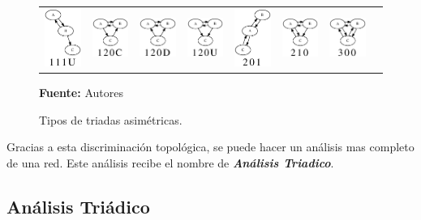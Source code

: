 \begin{figure}[!htb]
\begin{center}
\begin{tabular}{m{1.3cm}|m{1.3cm}|m{1.3cm}|m{1.3cm}|m{1.3cm}|m{1.3cm}|m{1.3cm}|m{1.3cm}}
        \includegraphics[width=1.3cm]{./imagenes/triada_111U.eps} & 
        \includegraphics[width=1.3cm]{./imagenes/triada_120C.eps} & 
        \includegraphics[width=1.3cm]{./imagenes/triada_120D.eps} & 
        \includegraphics[width=1.3cm]{./imagenes/triada_120U.eps} & 
        \includegraphics[width=1.3cm]{./imagenes/triada_201.eps} & 
        \includegraphics[width=1.3cm]{./imagenes/triada_210.eps} & 
        \includegraphics[width=1.3cm]{./imagenes/triada_300.eps}\\
      \end{tabular}
    \caption{Tipos de triadas asimétricas.}
    \label{fig:tipos_triadas_asimetricas}
    \textbf{Fuente:}  Autores
  \end{center}
\end{figure}


Gracias a esta discriminación topológica, se puede hacer un análisis mas completo de una red. Este análisis recibe el nombre de \textbf{\textit{Análisis Triadico}}.

\subsection{Análisis Triádico}

